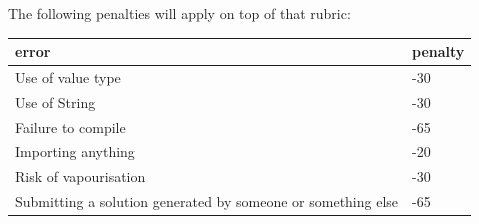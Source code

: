 \documentclass[twoside=false,DIV=14]{scrartcl}
\begin{document}
The following penalties will apply on top of that rubric:

\begin{tabular}{ll}
\textbf{error} & \textbf{penalty} \\
\hline
Use of value type & -30 \\
Use of String & -30 \\
Failure to compile & -65 \\
Importing anything & -20 \\
Risk of vapourisation & -30 \\
Submitting a solution generated by someone or something else & -65 \\
\end{tabular}
\end{document}
